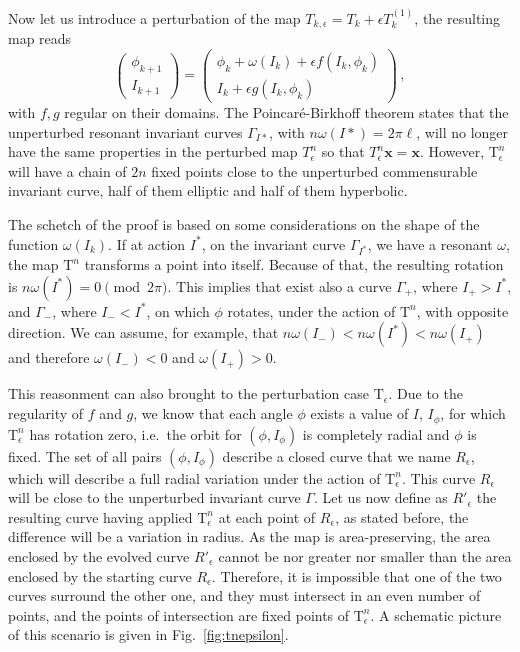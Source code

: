 Now let us introduce a perturbation of the map $T_{k,\epsilon} = T_k + \epsilon T^{(1)}_k$, the resulting map reads
\begin{equation}
	\begin{pmatrix} \phi_{k+1} \\ I_{k+1} \end{pmatrix}  = \begin{pmatrix} \phi_k + \omega(I_k) + \epsilon f(I_k, \phi_k) \\ I_k  + \epsilon g(I_k, \phi_k) \end{pmatrix} \, ,
    \label{eq:area_perturbed_map}
\end{equation}
with $f, g$ regular on their domains. The Poincaré-Birkhoff theorem states that the unperturbed resonant invariant curves $\Gamma_{I*}$, with $n\omega(I*)=2\pi \ell$, will no longer have the same properties in the perturbed map $T_\epsilon^n$ so that $T_\epsilon^n \mathbf{x} = \mathbf{x}$. However, $\mathrm{T}^n_\epsilon$ will have a chain of $2n$ fixed points close to the unperturbed commensurable invariant curve, half of them elliptic and half of them hyperbolic.

The schetch of the proof is based on some considerations on the shape of the function $\omega(I_k)$. If at action $I^*$, on the invariant curve $\Gamma_{I^*}$, we have a resonant $\omega$, the map $\mathrm{T}^n$ transforms a point into itself. Because of that, the resulting rotation is $n\omega(I^*)=0 \pmod{2\pi}$. This implies that exist also a curve $\Gamma_+$, where $I_+>I^*$, and $\Gamma_-$, where $I_-<I^*$, on which $\phi$ rotates, under the action of $\mathrm{T}^n$, with opposite direction. We can assume, for example, that $n\omega(I_-)<n\omega(I^*)<n\omega(I_+)$ and therefore $\omega(I_-)<0$ and $\omega(I_+)>0$.

This reasonment can also brought to the perturbation case $\mathrm{T}_\epsilon$. Due to the regularity of $f$ and $g$, we know that each angle $\phi$ exists a value of $I$, $I_\phi$, for which $\mathrm{T}^n_\epsilon$ has rotation zero, i.e.\ the orbit for $(\phi, I_\phi)$ is completely radial and $\phi$ is fixed. The set of all pairs $(\phi, I_\phi)$ describe a closed curve that we name $R_\epsilon$, which will describe a full radial variation under the action of $\mathrm{T}^n_\epsilon$. This curve $R_\epsilon$ will be close to the unperturbed invariant curve $\Gamma$. Let us now define as $R'_\epsilon$ the resulting curve having applied $\mathrm{T}^n_\epsilon$ at each point of $R_\epsilon$, as stated before, the difference will be a variation in radius. As the map is area-preserving, the area enclosed by the evolved curve $R'_\epsilon$ cannot be nor greater nor smaller than the area enclosed by the starting curve $R_\epsilon$. Therefore, it is impossible that one of the two curves surround the other one, and they must intersect in an even number of points, and the points of intersection are fixed points of $\mathrm{T}^n_\epsilon$. A schematic picture of this scenario is given in Fig.~\ref{fig:tnepsilon}.

